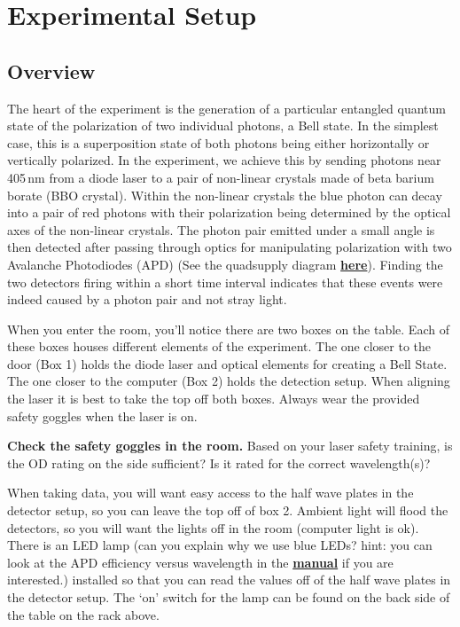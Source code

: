 \documentclass{../lab}
\begin{document}
\section{Experimental Setup}

\subsection{Overview}

The heart of the experiment is the generation of a particular entangled quantum state of the polarization of two individual photons, a Bell state. In the simplest case, this is a superposition state of both photons being either horizontally or vertically polarized. In the experiment, we achieve this by sending photons near 405\,nm from a diode laser to a pair of non-linear crystals made of beta barium borate (BBO crystal). Within the non-linear crystals the blue photon can decay into a pair of red photons with their polarization being determined by the optical axes of the non-linear crystals. The photon pair emitted under a small angle is then detected after passing through optics for manipulating polarization with two Avalanche Photodiodes (APD) (See the quadsupply diagram \href{https://drive.google.com/file/d/1jYAbLmue-vkkq-x0vIwep98wGffPeys4/view?usp=drive_link}{\textbf{here}}). Finding the two detectors firing within a short time interval indicates that these events were indeed caused by a photon pair and not stray light.

When you enter the room, you'll notice there are two boxes on the table. Each of these boxes houses different elements of the experiment. The one closer to the door (Box 1) holds the diode laser and optical elements for creating a Bell State. The one closer to the computer (Box 2) holds the detection setup. When aligning the laser it is best to take the top off both boxes. Always wear the provided safety goggles when the laser is on. 

\textbf{Check the safety goggles in the room.} Based on your laser safety training, is the OD rating on the side sufficient? Is it rated for the correct wavelength(s)?


When taking data, you will want easy access to the half wave plates in the detector setup, so you can leave the top off of box 2. Ambient light will flood the detectors, so you will want the lights off in the room (computer light is ok). There is an LED lamp \cite{bluelaser} (can you explain why we use blue LEDs? hint: you can look at the APD efficiency versus wavelength in the \href{https://drive.google.com/file/d/17SI-NyknjP7zrS3YAGSdCFkFAXRjYj9b/view?usp=drive_link}{\textbf{manual}} if you are interested.) installed so that you can read the values off of the half wave plates in the detector setup. The `on' switch for the lamp can be found on the back side of the table on the rack above.
\end{document}
